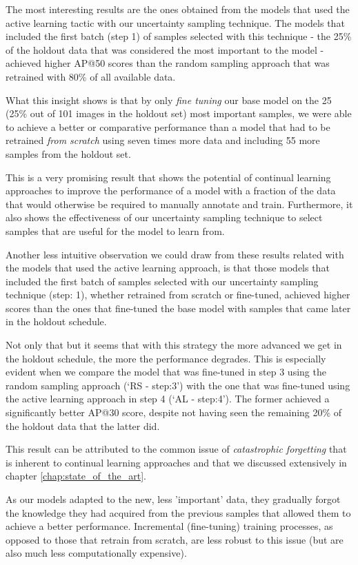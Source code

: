 \documentclass[../main.tex]{subfiles}
\begin{document}
The most interesting results are the ones obtained from the models that used the active learning tactic with our uncertainty sampling technique. The models that included the first batch (step 1) of samples selected with this technique - the 25\% of the holdout data that was considered the most important to the model - achieved higher AP@50 scores than the random sampling approach that was retrained with 80\% of all available data.

What this insight shows is that by only \textit{fine tuning} our base model on the 25 (25\% out of 101 images in the holdout set) most important samples, we were able to achieve a better or comparative performance than a model that had to be retrained \textit{from scratch} using seven times more data and including 55 more samples from the holdout set.

This is a very promising result that shows the potential of continual learning approaches to improve the performance of a model with a fraction of the data that would otherwise be required to manually annotate and train. Furthermore, it also shows the effectiveness of our uncertainty sampling technique to select samples that are useful for the model to learn from.

Another less intuitive observation we could draw from these results related with the models that used the active learning approach, is that those models that included the first batch of samples selected with our uncertainty sampling technique (step: 1), whether retrained from scratch or fine-tuned, achieved higher scores than the ones that fine-tuned the base model with samples that came later in the holdout schedule.

Not only that but it seems that with this strategy the more advanced we get in the holdout schedule, the more the performance degrades. This is especially evident when we compare the model that was fine-tuned in step 3 using the random sampling approach (`RS - step:3') with the one that was fine-tuned using the active learning approach in step 4 (`AL - step:4'). The former achieved a significantly better AP@30 score, despite not having seen the remaining 20\% of the holdout data that the latter did.


This result can be attributed to the common issue of \textit{catastrophic forgetting} that is inherent to continual learning approaches and that we discussed extensively in chapter \ref{chap:state_of_the_art}. 

As our models adapted to the new, less 'important' data, they gradually forgot the knowledge they had acquired from the previous samples that allowed them to achieve a better performance. Incremental (fine-tuning) training processes, as opposed to those that retrain from scratch, are less robust to this issue (but are also much less computationally expensive).
\end{document}
